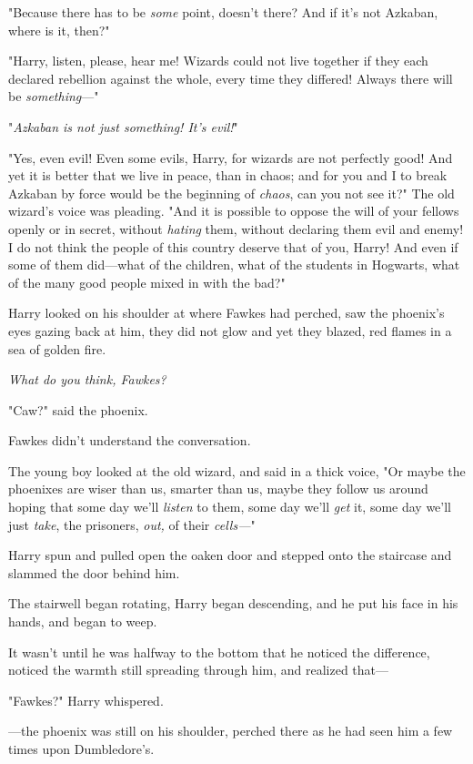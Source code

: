 "Because there has to be \emph{some} point, doesn't there? And if it's not
Azkaban, where is it, then?"

"Harry, listen, please, hear me! Wizards could not live together if they each
declared rebellion against the whole, every time they differed! Always there
will be \emph{something}---"

"\emph{Azkaban is not just something! It's evil!}"

"Yes, even evil! Even some evils, Harry, for wizards are not perfectly good!
And yet it is better that we live in peace, than in chaos; and for you and I to
break Azkaban by force would be the beginning of \emph{chaos}, can you not see
it?" The old wizard's voice was pleading. "And it is possible to oppose the
will of your fellows openly or in secret, without \emph{hating} them, without
declaring them evil and enemy! I do not think the people of this country
deserve that of you, Harry! And even if some of them did---what of the
children, what of the students in Hogwarts, what of the many good people mixed
in with the bad?"

Harry looked on his shoulder at where Fawkes had perched, saw the phoenix's
eyes gazing back at him, they did not glow and yet they blazed, red flames in a
sea of golden fire.

\emph{What do you think, Fawkes?}

"Caw?" said the phoenix.

Fawkes didn't understand the conversation.

The young boy looked at the old wizard, and said in a thick voice, "Or maybe
the phoenixes are wiser than us, smarter than us, maybe they follow us around
hoping that some day we'll \emph{listen} to them, some day we'll \emph{get} it,
some day we'll just \emph{take}, the prisoners, \emph{out,} of their
\emph{cells---}"

Harry spun and pulled open the oaken door and stepped onto the staircase and
slammed the door behind him.

The stairwell began rotating, Harry began descending, and he put his face in
his hands, and began to weep.

It wasn't until he was halfway to the bottom that he noticed the difference,
noticed the warmth still spreading through him, and realized that---

"Fawkes?" Harry whispered.

---the phoenix was still on his shoulder, perched there as he had seen him a
few times upon Dumbledore's.

